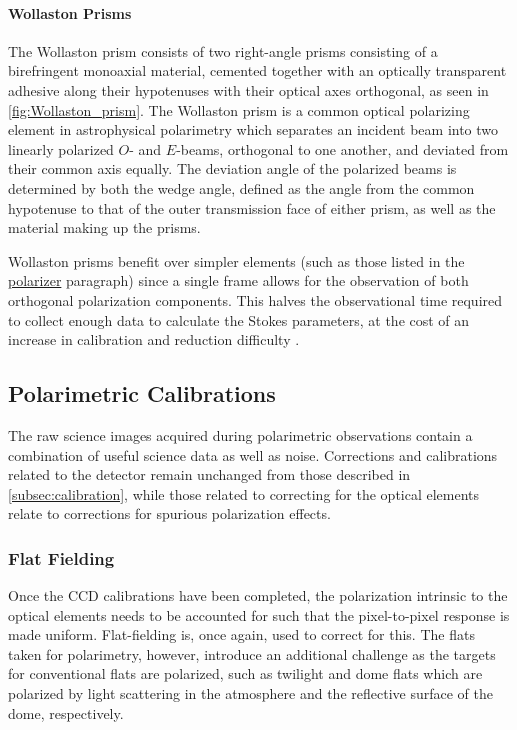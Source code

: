 \paragraph{Wollaston Prisms} \label{par:wollaston}
The Wollaston prism consists of two right-angle prisms consisting of a birefringent monoaxial material, cemented together with an optically transparent adhesive along their hypotenuses with their optical axes orthogonal, as seen in \autoref{fig:Wollaston_prism}.
The Wollaston prism is a common optical polarizing element in astrophysical polarimetry which separates an incident beam into two linearly polarized $O$- and $E$-beams, orthogonal to one another, and deviated from their common axis equally.
The deviation angle of the polarized beams is determined by both the wedge angle, defined as the angle from the common hypotenuse to that of the outer transmission face of either prism, as well as the material making up the prisms.

Wollaston prisms benefit over simpler elements (such as those listed in the \hyperref[par:polarizer]{polarizer} paragraph) since a single frame allows for the observation of both orthogonal polarization components.
This halves the observational time required to collect enough data to calculate the Stokes parameters, at the cost of an increase in calibration and reduction difficulty \citep{wollaston}.

\subsection{Polarimetric Calibrations} \label{subsec:pol_cal}

The raw science images acquired during polarimetric observations contain a combination of useful science data as well as noise.
Corrections and calibrations related to the detector remain unchanged from those described in \autoref{subsec:calibration}, while those related to correcting for the optical elements relate to corrections for spurious polarization effects.

\subsubsection{Flat Fielding} \label{subsubsec:pol_flat}

Once the \gls{CCD} calibrations have been completed, the polarization intrinsic to the optical elements needs to be accounted for such that the pixel-to-pixel response is made uniform.
Flat-fielding is, once again, used to correct for this.
The flats taken for polarimetry, however, introduce an additional challenge as the targets for conventional flats are polarized, such as twilight and dome flats which are polarized by light scattering in the atmosphere and the reflective surface of the dome, respectively.

